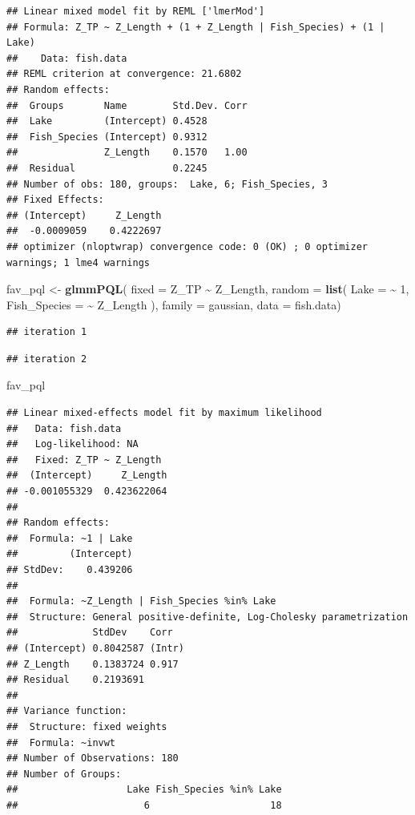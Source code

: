 \documentclass[
]{article}
\newenvironment{Shaded}{\begin{snugshade}}{\end{snugshade}}
\newcommand{\AttributeTok}[1]{\textcolor[rgb]{0.13,0.29,0.53}{#1}}
\newcommand{\DecValTok}[1]{\textcolor[rgb]{0.00,0.00,0.81}{#1}}
\newcommand{\FunctionTok}[1]{\textcolor[rgb]{0.13,0.29,0.53}{\textbf{#1}}}
\newcommand{\NormalTok}[1]{#1}
\newcommand{\OtherTok}[1]{\textcolor[rgb]{0.56,0.35,0.01}{#1}}
\newcommand{\SpecialCharTok}[1]{\textcolor[rgb]{0.81,0.36,0.00}{\textbf{#1}}}
\begin{document}
\begin{verbatim}
## Linear mixed model fit by REML ['lmerMod']
## Formula: Z_TP ~ Z_Length + (1 + Z_Length | Fish_Species) + (1 | Lake)
##    Data: fish.data
## REML criterion at convergence: 21.6802
## Random effects:
##  Groups       Name        Std.Dev. Corr
##  Lake         (Intercept) 0.4528       
##  Fish_Species (Intercept) 0.9312       
##               Z_Length    0.1570   1.00
##  Residual                 0.2245       
## Number of obs: 180, groups:  Lake, 6; Fish_Species, 3
## Fixed Effects:
## (Intercept)     Z_Length  
##  -0.0009059    0.4222697  
## optimizer (nloptwrap) convergence code: 0 (OK) ; 0 optimizer warnings; 1 lme4 warnings
\end{verbatim}

\begin{Shaded}
\begin{Highlighting}[]
\NormalTok{fav\_pql }\OtherTok{\textless{}{-}} \FunctionTok{glmmPQL}\NormalTok{(}
  \AttributeTok{fixed =}\NormalTok{ Z\_TP }\SpecialCharTok{\textasciitilde{}}\NormalTok{ Z\_Length,}
  \AttributeTok{random =} \FunctionTok{list}\NormalTok{(}
    \AttributeTok{Lake =} \SpecialCharTok{\textasciitilde{}} \DecValTok{1}\NormalTok{,}
    \AttributeTok{Fish\_Species =} \SpecialCharTok{\textasciitilde{}}\NormalTok{ Z\_Length}
\NormalTok{  ),}
  \AttributeTok{family =}\NormalTok{ gaussian,}
  \AttributeTok{data =}\NormalTok{ fish.data)}
\end{Highlighting}
\end{Shaded}

\begin{verbatim}
## iteration 1
\end{verbatim}

\begin{verbatim}
## iteration 2
\end{verbatim}

\begin{Shaded}
\begin{Highlighting}[]
\NormalTok{fav\_pql}
\end{Highlighting}
\end{Shaded}

\begin{verbatim}
## Linear mixed-effects model fit by maximum likelihood
##   Data: fish.data 
##   Log-likelihood: NA
##   Fixed: Z_TP ~ Z_Length 
##  (Intercept)     Z_Length 
## -0.001055329  0.423622064 
## 
## Random effects:
##  Formula: ~1 | Lake
##         (Intercept)
## StdDev:    0.439206
## 
##  Formula: ~Z_Length | Fish_Species %in% Lake
##  Structure: General positive-definite, Log-Cholesky parametrization
##             StdDev    Corr  
## (Intercept) 0.8042587 (Intr)
## Z_Length    0.1383724 0.917 
## Residual    0.2193691       
## 
## Variance function:
##  Structure: fixed weights
##  Formula: ~invwt 
## Number of Observations: 180
## Number of Groups: 
##                   Lake Fish_Species %in% Lake 
##                      6                     18
\end{verbatim}
\end{document}
